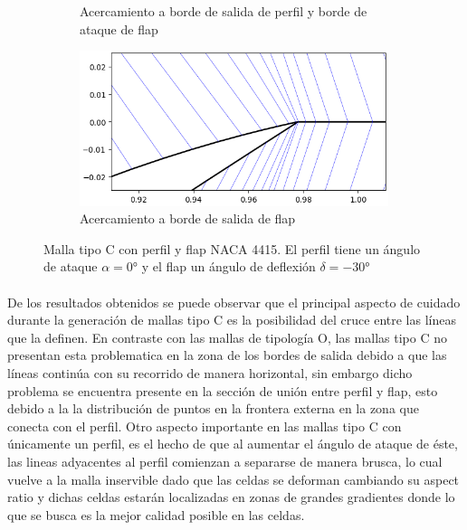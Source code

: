 \documentclass[letterpaper, openright, 12pt]{book}
\begin{document}
\begin{figure}[htbp!]
\begin{subfigure}[c]{0.45\textwidth}
            \caption{Acercamiento a borde de salida de perfil y borde de
                ataque de flap}
            \label{fig:naca4415_c_flap_-30_both}
        \end{subfigure}
        \begin{subfigure}[c]{0.45\textwidth}
            \includegraphics[keepaspectratio,
                width=0.99\textwidth]{./img/naca4415_c_flap_-30_flap}
            \caption{Acercamiento a borde de salida de flap}
            \label{fig:naca4415_c_flap_-30_flap}
        \end{subfigure}
        \caption[Malla tipo C con perfil y flap NACA 4415 a
            $-30\si{\degree}$]{Malla tipo C con perfil y flap NACA 4415. El
            perfil tiene un ángulo de ataque $\alpha = 0\si{\degree}$ y el
            flap un ángulo de deflexión $\delta = -30\si{\degree}$}
    \end{figure}

    \paragraph*{}
    De los resultados obtenidos se puede observar que el principal aspecto de
    cuidado durante la generación de mallas tipo C es la posibilidad del cruce
    entre las líneas que la definen. En contraste con las mallas de tipología
    O, las mallas tipo C no presentan esta problematica en la zona de los
    bordes de salida debido a que las líneas continúa con su recorrido de
    manera horizontal, sin embargo dicho problema se encuentra presente en la
    sección de unión entre perfil y flap, esto debido a la la distribución de
    puntos en la frontera externa en la zona que conecta con el perfil.
    Otro aspecto importante en las mallas tipo C con únicamente un perfil, es
    el hecho de que al aumentar el ángulo de ataque de éste, las lineas
    adyacentes al perfil comienzan a separarse de manera brusca, lo cual vuelve
    a la malla inservible dado que las celdas se deforman cambiando su aspect
    ratio y dichas celdas estarán localizadas en zonas de grandes gradientes
    donde lo que se busca es la mejor calidad posible en las celdas.
\end{document}
